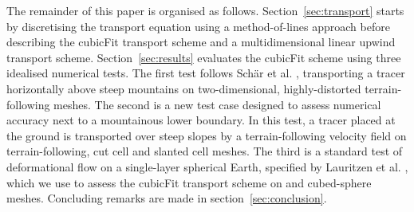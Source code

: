 The remainder of this paper is organised as follows.
Section~\ref{sec:transport} starts by discretising the transport equation using a method-of-lines approach before describing the cubicFit transport scheme and a multidimensional linear upwind transport scheme.
Section~\ref{sec:results} evaluates the cubicFit scheme using three idealised numerical tests.
The first test follows Sch\"ar et al. \citep{schaer2002}, transporting a tracer horizontally above steep mountains on two-dimensional, highly-distorted terrain-following meshes.
The second is a new test case designed to assess numerical accuracy next to a mountainous lower boundary.  In this test, a tracer placed at the ground is transported over steep slopes by a terrain-following velocity field on terrain-following, cut cell and slanted cell meshes.
The third is a standard test of deformational flow on a single-layer spherical Earth, specified by Lauritzen et al. \citep{lauritzen2012}, which we use to assess the cubicFit transport scheme on  and cubed-sphere meshes.
Concluding remarks are made in section~\ref{sec:conclusion}.

